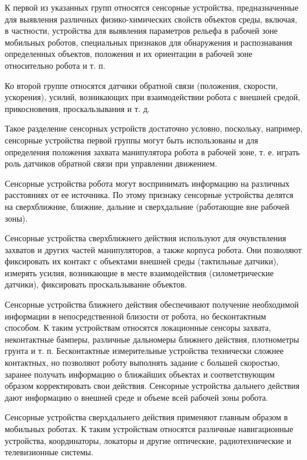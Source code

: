 К первой из указанных групп относятся сенсорные устройства, предназначенные для выявления различных физико-химических свойств объектов среды, включая, в частности, устройства для выявления параметров рельефа в рабочей зоне мобильных роботов, специальных признаков для обнаружения и распознавания определенных объектов, положения и их ориентации в рабочей зоне относительно робота и т. п.

Ко второй группе относятся датчики обратной связи (положения, скорости, ускорения), усилий, возникающих при взаимодействии робота с внешней средой, прикосновения, проскальзывания и т. д.

Такое разделение сенсорных устройств достаточно условно, поскольку, например, сенсорные устройства первой группы могут быть использованы и для определения положения захвата манипулятора робота в рабочей зоне, т. е. играть роль датчиков обратной связи при управлении движением.

Сенсорные устройства робота могут воспринимать информацию на различных расстояниях от ее источника. По этому признаку сенсорные устройства делятся на сверхближние, ближние, дальние и сверхдальние (работающие вне рабочей зоны).

Сенсорные устройства сверхближнего действия используют для очувствления захватов и других частей манипуляторов, а также корпуса робота. Они позволяют фиксировать их контакт с объектами внешней среды (тактильные датчики), измерять усилия, возникающие в месте взаимодействия (силометрические датчики), фиксировать проскальзывание объектов.

Сенсорные устройства ближнего действия обеспечивают получение необходимой информации в непосредственной близости от робота, но бесконтактным способом. К таким устройствам относятся локационные сенсоры захвата, неконтактные бамперы, различные дальномеры ближнего действия, плотнометры грунта и т. п. Бесконтактные измерительные устройства технически сложнее контактных, но позволяют роботу выполнять задание с большей скоростью, заранее получать информацию о ближайших объектах и соответствующим образом корректировать свои действия.
Сенсорные устройства дальнего действия дают информацию о внешней среде и объеме всей рабочей зоны робота.

Сенсорные устройства сверхдальнего действия применяют главным образом в мобильных роботах. К таким устройствам относятся различные навигационные устройства, координаторы, локаторы и другие оптические, радиотехнические и телевизионные системы.

